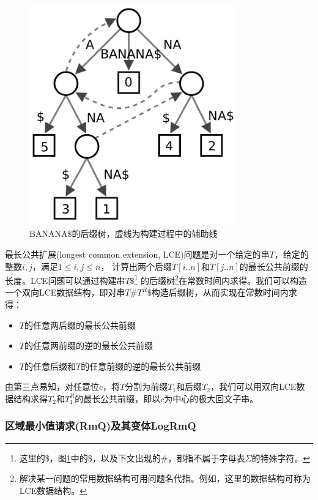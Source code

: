 \begin{figure}[h]
    \centering
    \includegraphics[width=0.8\textwidth]{resources/fig/Suffix_tree_BANANA}
    \caption{$\mathrm{BANANA\$}$的后缀树，虚线为构建过程中的辅助线}\label{fig:suffix}
\end{figure}

最长公共扩展(longest common extension, LCE)问题是对一个给定的串$T$，给定的整数$i,j$，满足$1 \leq i,j \leq n$，
计算出两个后缀$T[i..n]$和$T[j..n]$的最长公共前缀的长度。LCE问题可以通过构建串$T\$$\footnote{这里的\$，图\ref{fig:suffix}中的\$，以及下文出现的\#，都指不属于字母表$\Sigma$的特殊字符。}
的后缀树\footnote{解决某一问题的常用数据结构可用问题名代指。例如，这里的数据结构可称为LCE数据结构。}在常数时间内求得\cite{Gusfield_1997}。我们可以构造一个双向LCE数据结构，即对串$T\#T^R\$$构造后缀树，从而实现在常数时间内求得：
\begin{itemize}
    \item $T$的任意两后缀的最长公共前缀
    \item $T$的任意两前缀的逆的最长公共前缀
    \item $T$的任意后缀和$T$的任意前缀的逆的最长公共前缀
\end{itemize}
由第三点易知，对任意位$c$，将$T$分割为前缀$T_1$和后缀$T_2$，我们可以用双向LCE数据结构求得$T_2$和$T_1^R$的最长公共前缀，即以$c$为中心的极大回文子串。

\subsubsection{区域最小值请求(RmQ)及其变体LogRmQ}\label{subsubsec:rmq}

